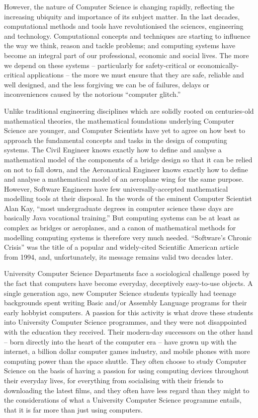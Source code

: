 \documentclass[sigconf]{acmart}
\begin{document}
However, the nature of Computer Science is changing rapidly,
reflecting the increasing ubiquity and importance of its subject
matter.  In the last decades, computational methods and tools have
revolutionised the sciences, engineering and technology. Computational
concepts and techniques are starting to influence the way we think,
reason and tackle problems; and computing systems have become an
integral part of our professional, economic and social lives.  The
more we depend on these systems -- particularly for safety-critical or
economically-critical applications -- the more we must ensure that
they are safe, reliable and well designed, and the less forgiving we
can be of failures, delays or inconveniences caused by the notorious
``computer glitch.''

Unlike traditional engineering disciplines which are solidly rooted on
centuries-old mathematical theories, the mathematical foundations
underlying Computer Science are younger, and Computer Scientists have
yet to agree on how best to approach the fundamental concepts and
tasks in the design of computing systems.  The Civil Engineer knows
exactly how to define and analyse a mathematical model of the
components of a bridge design so that it can be relied on not to fall
down, and the Aeronautical Engineer knows exactly how to define and
analyse a mathematical model of an aeroplane wing for the same
purpose.  However, Software Engineers have few universally-accepted
mathematical modelling tools at their disposal.  In the words of the
eminent Computer Scientist Alan Kay, ``most undergraduate degrees in
computer science these days are basically Java vocational training.''
But computing systems can be at least as complex as bridges or
aeroplanes, and a canon of mathematical methods for modelling
computing systems is therefore very much needed.  ``Software's Chronic
Crisis'' was the title of a popular and widely-cited Scientific
American article from 1994, and, unfortunately, its message remains
valid two decades later. 

University Computer Science Departments face a sociological challenge
posed by the fact that computers have become everyday, deceptively
easy-to-use objects.  A single generation ago, new Computer Science
students typically had teenage backgrounds spent writing Basic and/or
Assembly Language programs for their early hobbyist computers.  A
passion for this activity is what drove these students into University
Computer Science programmes, and they were not disappointed with the
education they received.  Their modern-day successors on the other
hand -- born directly into the heart of the computer era -- have grown
up with the internet, a billion dollar computer games industry, and
mobile phones with more computing power than the space shuttle.  They
often choose to study Computer Science on the basis of having a
passion for using computing devices throughout their everyday lives,
for everything from socialising with their friends to downloading the
latest films, and they often have less regard than they might to the
considerations of what a University Computer Science programme
entails, that it is far more than just using computers.
\end{document}
